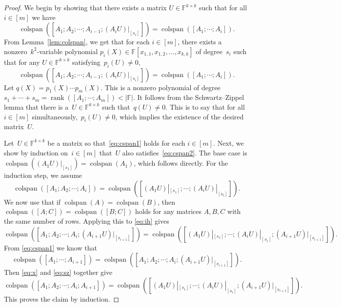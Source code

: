 \documentclass[11pt]{article}
\newcommand{\FF}{\mathbb{F}}
\DeclareMathOperator{\rank}{rank} \DeclareMathOperator{\col}{colspan}
\begin{document}
\begin{proof}
We begin by showing that there exists a matrix $U \in \FF^{k \times k}$ such that for all $i \in [m]$ we have 
\begin{equation}\label{eq:cspan1}
    \col([A_1 ; A_2 ; \cdots ; A_{i-1} ; (A_i U)|_{[s_i]}]) = \col([A_1; \cdots ; A_i]).
\end{equation}
From Lemma~\ref{lem:colspan}, we get that for each $i\in [m]$, there exists a nonzero~$k^2$-variable polynomial $p_i(X)\in \FF[x_{1,1},x_{1,2},\dots,x_{k,k}]$ of degree~$s_i$ such that for any $U\in \FF^{k\times k}$ satisfying~$p_i(U)\ne 0$,
\[
    \col([A_1 ; A_2 ; \cdots ; A_{i-1} ; (A_i U)|_{[s_i]}]) = \col([A_1; \cdots ; A_i]).
    \]
Let $q(X)=  p_1(X)\cdots p_m(X)$.
This is a nonzero polynomial of degree $s_1 + \cdots +s_m = \rank([A_1; \cdots; A_m])<|\FF|$.
It follows from the Schwartz--Zippel lemma \cite{DEMILLO1978193, schwartz1980fast, zippel1979probabilistic} that there is a~$U\in \FF^{k\times k}$ such that~$q(U) \ne 0$.
This is to say that for all~$i\in[m]$ simultaneously,~$p_i(U)\ne 0$, which implies the existence of the desired matrix~$U$.

Let~$U\in \FF^{k\times k}$ be a matrix so that~\eqref{eq:cspan1} holds for each $i\in [m]$.
Next, we show by induction on~$i\in[m]$ that~$U$ also satisfies~\eqref{eq:cspan2}.
The base case is $\col((A_1 U)|_{[s_1]}) = \col(A_1)$,
which follows directly.
For the induction step, we assume
\begin{equation}\label{eq:ih}
    \col([A_1 ; A_2 ; \cdots ; A_i]) = \col([(A_1U)|_{[s_1]} ; \cdots ; (A_iU)|_{[s_i]}]).
\end{equation}
We now use that if $\col(A) = \col(B)$, then $\col([A ; C]) = \col([B;C])$ holds for any matrices $A,B,C$ with the same number of rows. Applying this to \eqref{eq:ih} gives
\begin{equation}\label{eq:x}
    \col([A_1 ; A_2 ; \cdots ; A_i; (A_{i+1} U)|_{[s_{i+1}]}]) = \col([(A_1U)|_{[s_1]} ; \cdots ; (A_iU)|_{[s_i]}; (A_{i+1} U)|_{[s_{i+1}]}]).
\end{equation}
From \eqref{eq:cspan1} we know that 
\begin{equation}\label{eq:sz}
    \col([A_1; \cdots ; A_{i+1}]) = \col([A_1 ; A_2 ; \cdots ; A_i ; (A_{i+1} U)|_{[s_{i+1}]}]).
\end{equation}
%
%
Then \eqref{eq:x} and \eqref{eq:sz} together give
    \[
    \col([A_1 ; A_2 ; \cdots ; A_i; A_{i+1}]) = \col([(A_1U)|_{[s_1]} ; \cdots ; (A_iU)|_{[s_i]}; (A_{i+1}U)|_{[s_{i+1}]}]).
    \]
This proves the claim by induction.
\end{proof}
\end{document}
